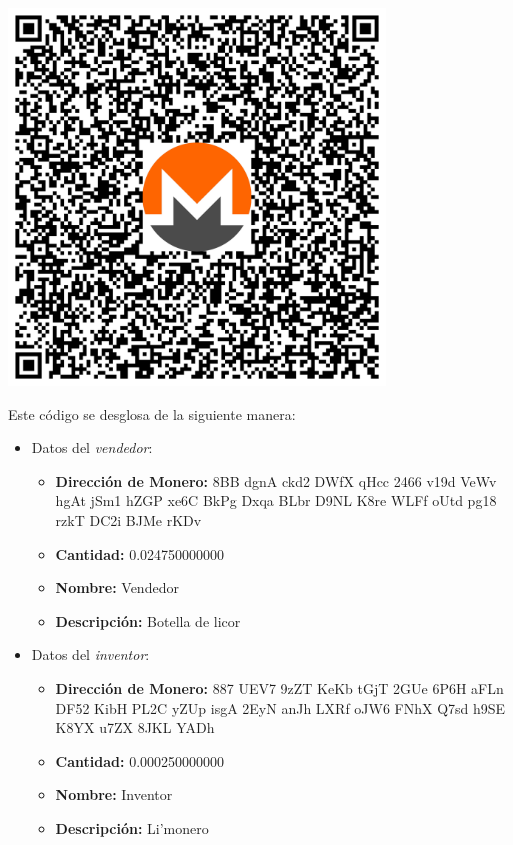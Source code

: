 \documentclass[12pt,a4paper]{article}
\begin{document}
\begin{center}
\includegraphics[width=0.75\textwidth]{media/qr-code2-es.pdf}
\end{center}

Este código se desglosa de la siguiente manera:

\begin{itemize}
\item Datos del \textit{vendedor}:
	\begin{itemize}
	\item \textbf{Dirección de Monero:} 8BB dgnA ckd2 DWfX qHcc 2466 v19d VeWv hgAt jSm1 hZGP xe6C BkPg Dxqa BLbr D9NL K8re WLFf oUtd pg18 rzkT DC2i BJMe rKDv
	\item \textbf{Cantidad:} 0.024750000000
	\item \textbf{Nombre:} Vendedor
	\item \textbf{Descripción:} Botella de licor
	\end{itemize}
\item Datos del \textit{inventor}:
	\begin{itemize}
	\item \textbf{Dirección de Monero:} 887 UEV7 9zZT KeKb tGjT 2GUe 6P6H aFLn DF52 KibH PL2C yZUp isgA 2EyN anJh LXRf oJW6 FNhX Q7sd h9SE K8YX u7ZX 8JKL YADh
	\item \textbf{Cantidad:} 0.000250000000
	\item \textbf{Nombre:} Inventor
	\item \textbf{Descripción:} Li'monero
	\end{itemize}
\end{itemize}
\end{document}
